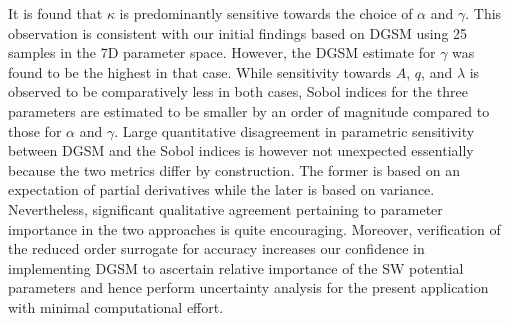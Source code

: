 It is found that $\kappa$ is predominantly sensitive towards the choice of $\alpha$ and
$\gamma$. This observation is consistent with our initial findings based on DGSM using 25 samples in the 7D
parameter space. However, the DGSM estimate for $\gamma$ was found to be the highest in that case. 
While sensitivity towards $A$, $q$, and $\lambda$ is observed to be comparatively less in both cases, Sobol
indices for the three parameters are estimated to be smaller by an order of magnitude compared to those
for $\alpha$ and $\gamma$. Large quantitative disagreement in parametric sensitivity between DGSM and the 
Sobol indices is however not unexpected essentially because the two metrics differ by construction.
The former is based
on an expectation of partial derivatives while the later is based on variance. Nevertheless, significant qualitative
agreement pertaining to parameter importance in the two approaches is quite encouraging. 
Moreover, verification of the reduced order
surrogate for accuracy increases our confidence in implementing DGSM to ascertain relative importance of the
SW potential parameters and hence perform uncertainty analysis for the present application with minimal
computational effort. 


























